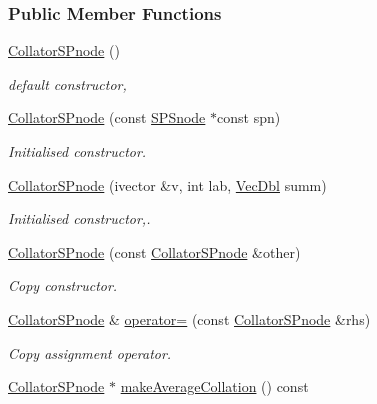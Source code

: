 \subsubsection*{\-Public \-Member \-Functions}
\begin{DoxyCompactItemize}
\item 
\hyperlink{classsubpavings_1_1CollatorSPnode_a6f444e76ad6e0c65535e6278dbd775e5}{\-Collator\-S\-Pnode} ()
\begin{DoxyCompactList}\small\item\em default constructor, \end{DoxyCompactList}\item 
\hyperlink{classsubpavings_1_1CollatorSPnode_a561b7d137e120403d17008ff837e0036}{\-Collator\-S\-Pnode} (const \hyperlink{classsubpavings_1_1SPSnode}{\-S\-P\-Snode} $\ast$const spn)
\begin{DoxyCompactList}\small\item\em \-Initialised constructor. \end{DoxyCompactList}\item 
\hyperlink{classsubpavings_1_1CollatorSPnode_ab4777c2f663dd1faaed8568fd0707a51}{\-Collator\-S\-Pnode} (ivector \&v, int lab, \hyperlink{namespacesubpavings_a6b4d2e61b2f0b65cacc9c9322d89bc37}{\-Vec\-Dbl} summ)
\begin{DoxyCompactList}\small\item\em \-Initialised constructor,. \end{DoxyCompactList}\item 
\hyperlink{classsubpavings_1_1CollatorSPnode_a4a01094e0378f8563fbbf40461d5b488}{\-Collator\-S\-Pnode} (const \hyperlink{classsubpavings_1_1CollatorSPnode}{\-Collator\-S\-Pnode} \&other)
\begin{DoxyCompactList}\small\item\em \-Copy constructor. \end{DoxyCompactList}\item 
\hyperlink{classsubpavings_1_1CollatorSPnode}{\-Collator\-S\-Pnode} \& \hyperlink{classsubpavings_1_1CollatorSPnode_a01020423e529685b484b95a73b6432ee}{operator=} (const \hyperlink{classsubpavings_1_1CollatorSPnode}{\-Collator\-S\-Pnode} \&rhs)
\begin{DoxyCompactList}\small\item\em \-Copy assignment operator. \end{DoxyCompactList}\item 
\hyperlink{classsubpavings_1_1CollatorSPnode}{\-Collator\-S\-Pnode} $\ast$ \hyperlink{classsubpavings_1_1CollatorSPnode_ac71288d7ccff2a3ddf1509f5b3a54930}{make\-Average\-Collation} () const 

\end{DoxyCompactItemize}
